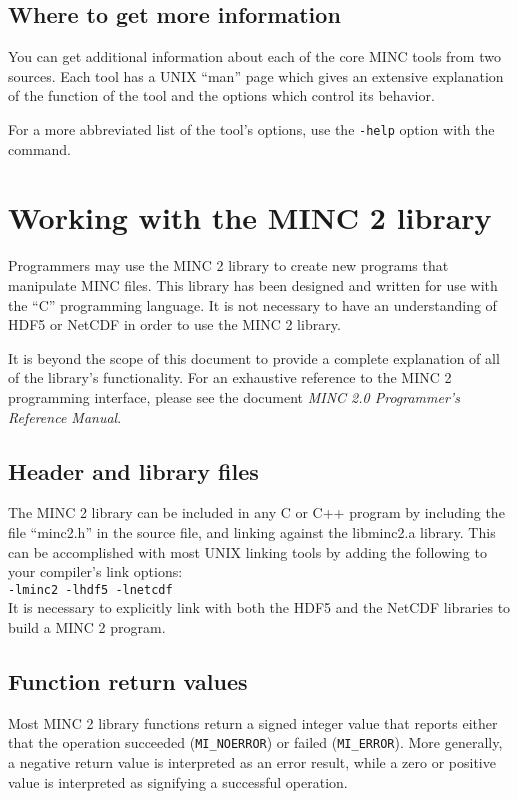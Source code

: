 \documentclass{article}
\begin{document}
\subsection{Where to get more information}
You can get additional information about each of the core MINC tools from
two sources.  Each tool has a UNIX ``man'' page which gives an extensive
explanation of the function of the tool and the options which control its
behavior.

For a more abbreviated list of the tool's options, use the {\tt -help} 
option with the command.

\newpage
\section{Working with the MINC 2 library}
Programmers may use the MINC 2 library to create new programs that manipulate
MINC files.  This library has been designed and written for use with the ``C''
programming language.  It is not necessary to have an understanding of HDF5
or NetCDF in order to use the MINC 2 library.

It is beyond the scope of this document to provide a complete
explanation of all of the library's functionality.  For an exhaustive
reference to the MINC 2 programming interface, please see the document
\emph{MINC 2.0 Programmer's Reference Manual}.

\subsection{Header and library files}
The MINC 2 library can be included in any C or C++ program by including
the file ``minc2.h'' in the source file, and linking against the libminc2.a
library.  This can be accomplished with most UNIX linking tools by adding
the following to your compiler's link options:\\

{\tt -lminc2 -lhdf5 -lnetcdf} \\

It is necessary to explicitly link with both the HDF5 and the NetCDF
libraries to build a MINC 2 program.

\subsection{Function return values}
Most MINC 2 library functions return a signed integer value that
reports either that the operation succeeded ({\tt MI\_NOERROR}) or
failed ({\tt MI\_ERROR}).  More generally, a negative return value
is interpreted as an error result, while a zero or positive value
is interpreted as signifying a successful operation.
\end{document}
